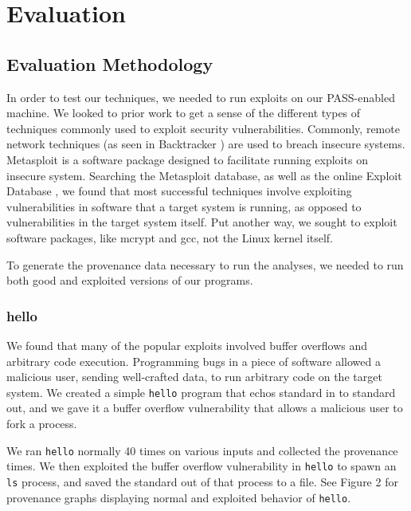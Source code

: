 \documentclass[10pt,twocolumn]{article}
\begin{document}
%

\section{Evaluation}

\subsection{Evaluation Methodology}
In order to test our techniques, we needed to run exploits on our PASS-enabled machine. We looked to prior work to get a sense of the different types of techniques commonly used to exploit security vulnerabilities. Commonly, remote network techniques (as seen in Backtracker \cite{backtracker}) are used to breach insecure systems. Metasploit \cite{metasploit} is a software package designed to facilitate running exploits on insecure system. Searching the Metasploit database, as well as the online Exploit Database \cite{exploitdb}, we found that most successful techniques involve exploiting vulnerabilities in software that a target system is running, as opposed to vulnerabilities in the target system itself. Put another way, we sought to exploit software packages, like mcrypt and gcc, not the Linux kernel itself. 

To generate the provenance data necessary to run the analyses, we needed to run both good and exploited versions of our programs.

\subsubsection{hello}
We found that many of the popular exploits involved buffer overflows and arbitrary code execution. Programming bugs in a piece of software allowed a malicious user, sending well-crafted data, to run arbitrary code on the target system. We created a simple \texttt{hello} program that echos standard in to standard out, and we gave it a buffer overflow vulnerability that allows a malicious user to fork a process. 

We ran \texttt{hello} normally 40 times on various inputs and collected the provenance times. We then exploited the buffer overflow vulnerability in \texttt{hello} to spawn an \texttt{ls} process, and saved the standard out of that process to a file. See Figure 2 for provenance graphs displaying normal and exploited behavior of \texttt{hello}.
\end{document}
